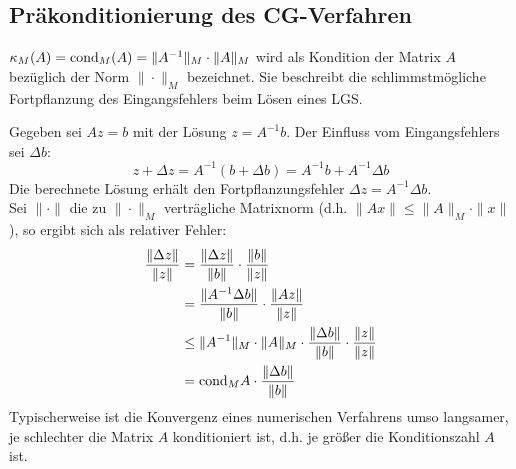 \documentclass{article}
\begin{document}
    \subsection{Präkonditionierung des CG-Verfahren}
    \begin{defbox}
        $\kappa_M(A) = \text{cond}_M(A) = \|A^{-1}\|_M\cdot \|A\|_M$ wird als Kondition der Matrix $A$ bezüglich 
        der Norm $\|\cdot\|_M$ bezeichnet. 
        Sie beschreibt die schlimmstmögliche Fortpflanzung des Eingangsfehlers beim Lösen eines LGS.
    \end{defbox}
    Gegeben sei $Az=b$ mit der Lösung $z=A^{-1}b$. Der Einfluss vom Eingangsfehlers sei $\Delta b$:
    \[z + \Delta z = A^{-1}(b+\Delta b) = A^{-1}b + A^{-1}\Delta b\]
    Die berechnete Lösung erhält den Fortpflanzungsfehler $\Delta z = A^{-1}\Delta b$. \\ 
    Sei $\|\cdot\|$ die zu $\|\cdot\|_M$ verträgliche Matrixnorm (d.h. $\|Ax\|\leq \|A\|_M\cdot\|x\|$), 
    so ergibt sich als relativer Fehler:
    \begin{align*}
        \dfrac{\|\Delta z\|}{\|z\|} &= \dfrac{\|\Delta z\|}{\|b\|} \cdot\dfrac{\|b\|}{\|z\|} \\
        &= \dfrac{\|A^{-1}\Delta b\|}{\|b\|} \cdot\dfrac{\|Az\|}{\|z\|} \\
        &\leq \|A^{-1}\|_M\cdot\|A\|_M\cdot\dfrac{\|\Delta b\|}{\|b\|}\cdot\dfrac{\|z\|}{\|z\|} \\
        &= \text{cond}_M{A}\cdot\dfrac{\|\Delta b\|}{\|b\|} \\
    \end{align*}
    Typischerweise ist die Konvergenz eines numerischen Verfahrens umso langsamer, je schlechter die Matrix $A$ 
    konditioniert ist, d.h. je größer die Konditionszahl $A$ ist. \\ \\
\end{document}
